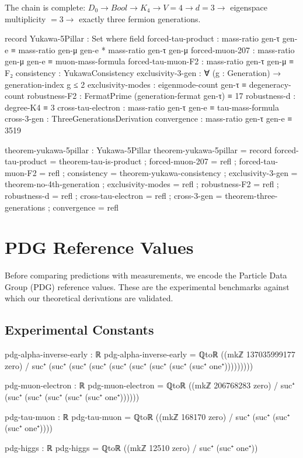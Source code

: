 \documentclass[11pt,a4paper]{book}
\def\text#1{#1}%
\begin{document}
The chain is complete: $D_0 \to \text{Bool} \to K_4 \to V = 4 \to d = 3 \to $ 
eigenspace multiplicity $= 3 \to$ exactly three fermion generations.

\begin{code}
record Yukawa-5Pillar : Set where
  field
    forced-tau-product   : mass-ratio gen-τ gen-e ≡ mass-ratio gen-μ gen-e * mass-ratio gen-τ gen-μ
    forced-muon-207      : mass-ratio gen-μ gen-e ≡ muon-mass-formula
    forced-tau-muon-F2   : mass-ratio gen-τ gen-μ ≡ F₂
    consistency          : YukawaConsistency
    exclusivity-3-gen    : ∀ (g : Generation) → generation-index g ≤ 2
    exclusivity-modes    : eigenmode-count gen-τ ≡ degeneracy-count
    robustness-F2        : FermatPrime (generation-fermat gen-τ) ≡ 17
    robustness-d         : degree-K4 ≡ 3
    cross-tau-electron   : mass-ratio gen-τ gen-e ≡ tau-mass-formula
    cross-3-gen          : ThreeGenerationsDerivation
    convergence          : mass-ratio gen-τ gen-e ≡ 3519

theorem-yukawa-5pillar : Yukawa-5Pillar
theorem-yukawa-5pillar = record
  { forced-tau-product   = theorem-tau-is-product
  ; forced-muon-207      = refl
  ; forced-tau-muon-F2   = refl
  ; consistency          = theorem-yukawa-consistency
  ; exclusivity-3-gen    = theorem-no-4th-generation
  ; exclusivity-modes    = refl
  ; robustness-F2        = refl
  ; robustness-d         = refl
  ; cross-tau-electron   = refl
  ; cross-3-gen          = theorem-three-generations
  ; convergence          = refl
  }
\end{code}

\chapter{PDG Reference Values}
\label{chap:pdg-values}

Before comparing predictions with measurements, we encode the Particle Data Group (PDG) 
reference values. These are the experimental benchmarks against which our theoretical derivations 
are validated.

\section{Experimental Constants}

\begin{code}
pdg-alpha-inverse-early : ℝ
pdg-alpha-inverse-early = ℚtoℝ ((mkℤ 137035999177 zero) / suc⁺ (suc⁺ (suc⁺ (suc⁺ (suc⁺ (suc⁺ (suc⁺ (suc⁺ (suc⁺ one⁺)))))))))

pdg-muon-electron : ℝ
pdg-muon-electron = ℚtoℝ ((mkℤ 206768283 zero) / suc⁺ (suc⁺ (suc⁺ (suc⁺ (suc⁺ (suc⁺ one⁺))))))

pdg-tau-muon : ℝ
pdg-tau-muon = ℚtoℝ ((mkℤ 168170 zero) / suc⁺ (suc⁺ (suc⁺ (suc⁺ one⁺))))

pdg-higgs : ℝ
pdg-higgs = ℚtoℝ ((mkℤ 12510 zero) / suc⁺ (suc⁺ one⁺))
\end{code}
\end{document}
